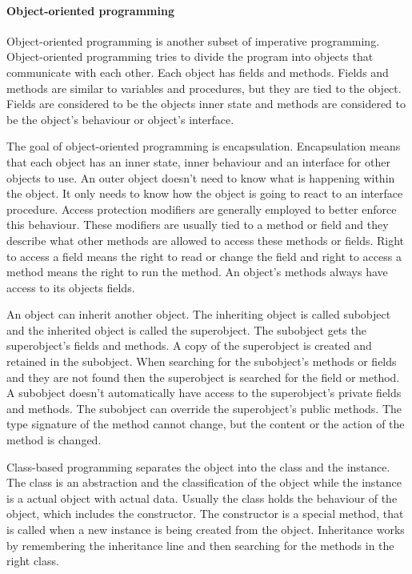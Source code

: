 \paragraph{Object-oriented programming}

Object-oriented programming is another subset of imperative programming.
Object-oriented programming tries to divide the program into objects that
communicate with each other. Each object has fields and methods. Fields and
methods are similar to variables and procedures, but they are tied to the
object. Fields are considered to be the objects inner state and methods are
considered to be the object's behaviour or object's
interface.\cite{website:object-orientation}

The goal of object-oriented programming is encapsulation. Encapsulation means
that each object has an inner state, inner behaviour and an interface for other
objects to use. An outer object doesn't need to know what is happening within
the object. It only needs to know how the object is going to react to an
interface procedure. Access protection modifiers are generally employed to
better enforce this behaviour. These modifiers are usually tied to a method or
field and they describe what other methods are allowed to access these methods
or fields. Right to access a field means the right to read or change the field
and right to access a method means the right to run the
method. An object's methods always have access to its objects
fields.\cite{website:access-modifiers}

An object can inherit another object. The inheriting object is called subobject and the inherited object is called the superobject. The subobject gets the superobject's fields and methods. A copy of the superobject is created and retained in the subobject. When searching for the subobject's methods or fields and they are not found then the superobject is searched for the field or method. A subobject doesn't automatically have access to the superobject's private fields and methods. The subobject can override the superobject's public methods. The type signature of the method cannot change, but the content or the action of the method is changed.

Class-based programming separates the object into the class and the instance.
The class is an abstraction and the classification of the object while the
instance is a actual object with actual data. Usually the class holds the
behaviour of the object, which includes the constructor. The constructor is a
special method, that is called when a new instance is being created from the
object. Inheritance works by remembering the inheritance line and then searching
for the methods in the right class.

